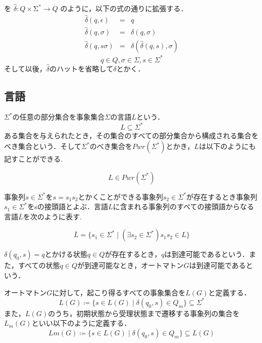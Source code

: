 \documentclass[dvipdfmx]{newthesis}
\begin{document}
を
$\hat{\delta}:Q\times\mathrm{\Sigma}^\ast\rightarrow Q$
のように，以下の式の通りに拡張する．
\begin{eqnarray*}
    \hat{\delta}(q,\epsilon) &=& q\\
    \hat{\delta}(q,\sigma) &=& \delta(q,\sigma)\\
    \hat{\delta}(q,s\sigma) &=& \delta(\hat{\delta}(q,s),\sigma)
\end{eqnarray*}
$$q \in Q, \sigma \in \Sigma, s \in \Sigma^\ast$$
そして以後，$\hat{\delta}$のハットを省略して$\delta$とかく．

\subsection{言語}

$\Sigma^\ast$の任意の部分集合を事象集合$\Sigma$の言語$L$という．
\begin{equation}
    L\subseteq\Sigma^\ast
\end{equation}
ある集合を与えられたとき，その集合のすべての部分集合から構成される集合をべき集合という．そして$\Sigma^\ast$のべき集合を$Pwr(\Sigma^\ast)$とかき，$L$は以下のようにも記すことができる.

\begin{equation}
    L\in Pwr(\Sigma^\ast)
\end{equation}

事象列$s\in\Sigma^\ast$を$s=s_1 s_2$とかくことができる事象列$s_2\in\Sigma^\ast$が存在するとき事象列$s_1\in\Sigma^\ast$をsの接頭語とよぶ．言語$L$に含まれる事象列のすべての接頭語からなる言語$\overline{L}$を次のように表す.

\begin{equation}
    \overline{L} = \{ s_1 \in\Sigma^\ast\mid(\exists s_2 \in \Sigma^\ast) s_1 s_2\in L\}
\end{equation}

$\delta(q_0,s)=q$とかける状態$q\in Q$が存在するとき，$q$は到達可能であるという．また，すべての状態$q\in Q$が到達可能なとき，オートマトン$G$は到達可能であるという．

オートマトン$G$に対して，起こり得るすべての事象集合を$L(G)$と定義する．
\begin{equation}
    L(G) \coloneqq \{s\in L(G) \mid \delta(q_0, s) \in Q_m\}\subseteq\Sigma^\ast
\end{equation}
また，$L(G)$のうち，初期状態から受理状態まで遷移する事象列の集合を$L_m(G)$といい以下のように定義する．
\begin{equation}
    Lm(G) \coloneqq \{s\in L(G) \mid \delta(q_0, s) \in Q_m\} \subseteq L(G)
\end{equation}
\end{document}

